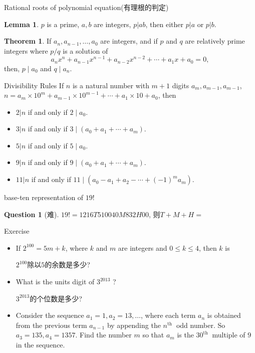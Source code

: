 \documentclass{beamer}
\theoremstyle{definition}
\newtheorem{theo}[defn]{Theorem}
\newtheorem{lem}[defn]{Lemma}
\newtheorem{ques}[defn]{Question}
\begin{document}
\begin{frame}{Rational roots of polynomial equation(有理根的判定)}
    \begin{lem}
        $p$ is a prime, $a,b$ are integers, $p|ab$, then either $p|a$ or $p|b$.
    \end{lem}
    \begin{theo}
        If $a_n, a_{n-1}, \ldots, a_0$ are integers, and if $p$ and $q$ are relatively prime integers where $p / q$ is a solution of
        $$
            a_n x^n+a_{n-1} x^{n-1}+a_{n-2} x^{n-2}+\cdots+a_1 x+a_0=0,
        $$
        then, $p \mid a_0$ and $q \mid a_n$.
    \end{theo}
\end{frame}
\begin{frame}{Divisibility Rules}
    If $n$ is a natural number with $m+1$ digits $a_m, a_{m-1}, a_{m-1}$, $n=a_m \times 10^m+a_{m-1} \times 10^{m-1}+\cdots+a_1 \times 10+a_0$, then
    \begin{itemize}
        \item $2|n$  if and only if $2 \mid a_0$.
        \item $3|n$  if and only if $3 \mid\left(a_0+a_1+\cdots+a_m\right)$.
        \item $5|n$  if and only if $5 \mid a_0$.
        \item $9|n$  if and only if $9 \mid\left(a_0+a_1+\cdots+a_m\right)$.
        \item $11|n$ if and only if $11 \mid\left(a_0-a_1+a_2-\cdots+(-1)^m a_m\right)$.
    \end{itemize}
\end{frame}
\begin{frame}{base-ten representation of $19!$}
    \begin{ques}[难]
        $19!=1216T510040M832H00$, 则$T+M+H=$
    \end{ques}
\end{frame}
\begin{frame}{Exercise}
    \begin{itemize}
        \item If $2^{100}=5 m+k$, where $k$ and $m$ are integers and $0 \leq k \leq 4$, then $k$ is

              $2^{100}$除以$5$的余数是多少?

        \item What is the units digit of $3^{2013}$ ?

              $3^{2013}$的个位数是多少?

        \item Consider the sequence $a_1=1, a_2=13, \ldots$, where each term $a_n$ is obtained from the previous term $a_{n-1}$ by appending the $n^{\text {th }}$ odd number.
              So $a_3=135, a_4=1357$. Find the number $m$ so that $a_m$ is the $30^{\text {th }}$ multiple of $9$ in the sequence.

    \end{itemize}

\end{frame}
\end{document}
